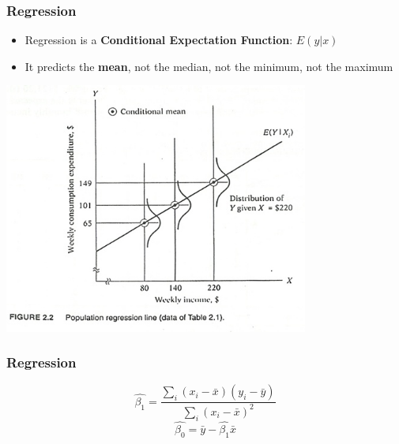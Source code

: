 \documentclass[xcolor=x11names,compress]{beamer}\usepackage[]{graphicx}\usepackage[]{color}
\renewcommand{\(}{\begin{columns}}
\renewcommand{\)}{\end{columns}}
\newcommand{\<}[1]{\begin{column}{#1}}
\renewcommand{\>}{\end{column}}
\begin{document}
\begin{frame}
\frametitle{Regression}
\begin{itemize}
\item Regression is a \textbf{Conditional Expectation Function}: $E(y|x)$
\pause
\item It predicts the \textbf{mean}, not the median, not the minimum, not the maximum
\end{itemize}
\includegraphics[width=0.75\textwidth]{CEF.jpg}
\end{frame}

\begin{frame}
\frametitle{Regression}
$$\hat{\beta_1}=\frac{\sum_i (x_i - \bar{x})(y_i - \bar{y})}{\sum_i (x_i - \bar{x})^2}$$
$$\hat{\beta_0}=\bar{y} - \hat{\beta_1} \bar{x}$$
\end{frame}
\end{document}

